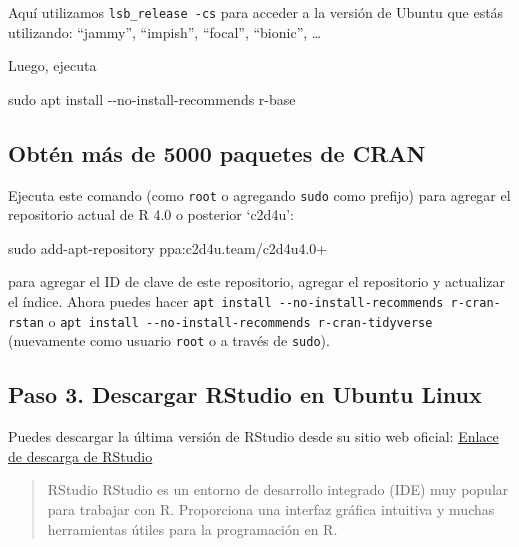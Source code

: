 \documentclass[
  jou,
  floatsintext,
  longtable,
  a4paper,
  nolmodern,
  notxfonts,
  notimes,
  colorlinks=true,linkcolor=blue,citecolor=blue,urlcolor=blue]{apa7}
\newenvironment{Shaded}{\begin{snugshade}}{\end{snugshade}}
\newcommand{\AttributeTok}[1]{\textcolor[rgb]{0.40,0.45,0.13}{#1}}
\newcommand{\FunctionTok}[1]{\textcolor[rgb]{0.28,0.35,0.67}{#1}}
\newcommand{\NormalTok}[1]{\textcolor[rgb]{0.00,0.23,0.31}{#1}}
\begin{document}
Aquí utilizamos \texttt{lsb\_release\ -cs} para acceder a la versión de
Ubuntu que estás utilizando: ``jammy'', ``impish'', ``focal'',
``bionic'', \ldots{}

Luego, ejecuta

\begin{Shaded}
\begin{Highlighting}[]
\FunctionTok{sudo}\NormalTok{ apt install }\AttributeTok{{-}{-}no{-}install{-}recommends}\NormalTok{ r{-}base}
\end{Highlighting}
\end{Shaded}

\subsection{Obtén más de 5000 paquetes de
CRAN}\label{obtuxe9n-muxe1s-de-5000-paquetes-de-cran}

Ejecuta este comando (como \texttt{root} o agregando \texttt{sudo} como
prefijo) para agregar el repositorio actual de R 4.0 o posterior
`c2d4u':

\begin{Shaded}
\begin{Highlighting}[]
\FunctionTok{sudo}\NormalTok{ add{-}apt{-}repository ppa:c2d4u.team/c2d4u4.0+}
\end{Highlighting}
\end{Shaded}

para agregar el ID de clave de este repositorio, agregar el repositorio
y actualizar el índice. Ahora puedes hacer
\texttt{apt\ install\ -\/-no-install-recommends\ r-cran-rstan} o
\texttt{apt\ install\ -\/-no-install-recommends\ r-cran-tidyverse}
(nuevamente como usuario \texttt{root} o a través de \texttt{sudo}).

\subsection{Paso 3. Descargar RStudio en Ubuntu
Linux}\label{paso-3.-descargar-rstudio-en-ubuntu-linux}

Puedes descargar la última versión de RStudio desde su sitio web
oficial:
\href{https://www.rstudio.com/products/rstudio/download/}{Enlace de
descarga de RStudio}

\begin{quote}
RStudio RStudio es un entorno de desarrollo integrado (IDE) muy popular
para trabajar con R. Proporciona una interfaz gráfica intuitiva y muchas
herramientas útiles para la programación en R.
\end{quote}
\end{document}
